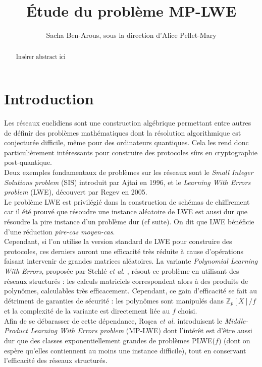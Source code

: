 \documentclass[11pt,a4paper]{article}
\title{\textbf{Étude du problème MP-LWE}}
\date{}
\author{Sacha Ben-Arous, sous la direction d'Alice Pellet-Mary}
\begin{document}
\maketitle 
\begin{abstract}
Insérer abstract ici \\
\end{abstract}
\tableofcontents
\newpage
\section{Introduction}
\; Les réseaux euclidiens sont une construction algébrique permettant entre autres de définir des problèmes mathématiques dont la résolution algorithmique est conjecturée difficile, même pour des ordinateurs quantiques. Cela les rend donc particulièrement intéressants pour construire des protocoles sûrs en cryptographie post-quantique. \\
Deux exemples fondamentaux de problèmes sur les réseaux sont le \textit{Small Integer Solutions problem} (SIS) introduit par Ajtai en 1996, et le \textit{Learning With Errors problem} (LWE), découvert par Regev en 2005. \\
Le problème LWE est privilégié dans la construction de schémas de chiffrement car il été prouvé \cite{wcac} que résoudre une instance aléatoire de LWE est aussi dur que résoudre la pire instance d'un problème dur (cf suite). On dit que LWE bénéficie d'une réduction \textit{pire-cas moyen-cas}. \\
Cependant, si l'on utilise la version standard de LWE pour construire des protocoles, ces derniers auront une efficacité très réduite à cause d'opérations faisant intervenir de grandes matrices aléatoires. La variante \textit{Polynomial Learning With Errors}, proposée par Stehlé \textit{et al.} \cite{plwe}, résout ce problème en utilisant des réseaux structurés : les calculs matriciels correspondent alors à des produits de polynômes, calculables très efficacement. Cependant, ce gain d'efficacité se fait au détriment de garanties de sécurité : les polynômes sont manipulés dans $\mathbb{Z}_p[X]/f$ et la complexité de la variante est directement liée au $f$ choisi. \\
Afin de se débarasser de cette dépendance, Roşca \textit{et al.} introduisent le \textit{Middle-Product Learning With Errors problem} (MP-LWE) \cite{mplwe} dont l'intérêt est d'être aussi dur que des classes exponentiellement grandes de problèmes PLWE($f$) (dont on espère qu'elles contiennent au moins une instance difficile), tout en conservant l'efficacité des réseaux structurés. \\
\end{document}
